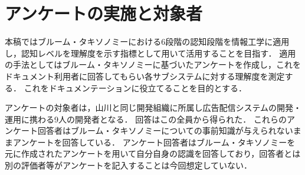 \section{アンケートの実施と対象者}
本稿ではブルーム・タキソノミーにおける6段階の認知段階を情報工学に適用し，認知レベルを理解度を示す指標として用いて活用することを目指す．
適用の手法としてはブルーム・タキソノミーに基づいたアンケートを作成し，これをドキュメント利用者に回答してもらい各サブシステムに対する理解度を測定する．
これをドキュメンテーションに役立てることを目的とする．

アンケートの対象者は，山川と同じ開発組織に所属し広告配信システムの開発・運用に携わる9人の開発者となる．
回答はこの全員から得られた．
これらのアンケート回答者はブルーム・タキソノミーについての事前知識が与えられないままアンケートを回答している．
アンケート回答者はブルーム・タキソノミーを元に作成されたアンケートを用いて自分自身の認識を回答しており，回答者とは別の評価者等がアンケートを記入することは今回想定していない．
